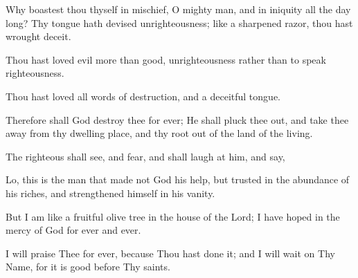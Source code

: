 Why boastest thou thyself in mischief, O mighty man, and in iniquity all the day long? Thy tongue hath devised unrighteousness; like a sharpened razor, thou hast wrought deceit.

Thou hast loved evil more than good, unrighteousness rather than to speak righteousness.

Thou hast loved all words of destruction, and a deceitful tongue.

Therefore shall God destroy thee for ever; He shall pluck thee out, and take thee away from thy dwelling place, and thy root out of the land of the living.

The righteous shall see, and fear, and shall laugh at him, and say,

Lo, this is the man that made not God his help, but trusted in the abundance of his riches, and strengthened himself in his vanity.

But I am like a fruitful olive tree in the house of the Lord; I have hoped in the mercy of God for ever and ever.

I will praise Thee for ever, because Thou hast done it; and I will wait on Thy Name, for it is good before Thy saints.
